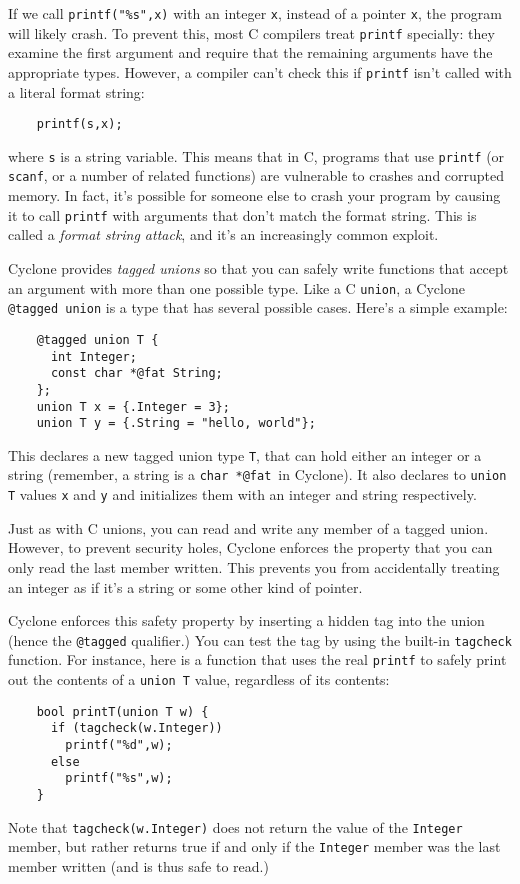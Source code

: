 If we call \texttt{printf("\%s",x)} with an integer \texttt{x},
instead of a pointer \texttt{x}, the program will likely crash.
To prevent this, most C compilers treat \texttt{printf} specially:
they examine the first argument and require that the remaining
arguments have the appropriate types.  However, a compiler can't check
this if \texttt{printf} isn't called with a literal format string:
\begin{verbatim}
    printf(s,x);
\end{verbatim}
where \texttt{s} is a string variable.  This means that in C, programs
that use \texttt{printf} (or \texttt{scanf}, or a number of related
functions) are vulnerable to crashes and corrupted memory.  In fact,
it's possible for someone else to crash your program by causing it to
call \texttt{printf} with arguments that don't match the format
string.  This is called a \emph{format string attack}, and it's an
increasingly common exploit.

Cyclone provides \emph{tagged unions} so that you can safely write
functions that accept an argument with more than one possible type.
Like a C \texttt{union}, a Cyclone \texttt{@tagged union} is a type that has
several possible cases.  Here's a simple example:
\begin{verbatim}
    @tagged union T {
      int Integer;
      const char *@fat String;
    };
    union T x = {.Integer = 3};
    union T y = {.String = "hello, world"};
\end{verbatim}
This declares a new tagged union type \texttt{T}, that can hold either an
integer or a string (remember, a string is a \texttt{char *@fat}\ in
Cyclone).  It also declares to \texttt{union T} values \texttt{x} and
\texttt{y} and initializes them with an integer and string respectively.

Just as with C unions, you can read and write any member of a tagged 
union.  However, to prevent security holes, Cyclone enforces the
property that you can only read the last member written.  This
prevents you from accidentally treating an integer as if it's
a string or some other kind of pointer.  

Cyclone enforces this safety property by inserting a hidden tag
into the union (hence the \texttt{@tagged} qualifier.)  
You can test the
tag by using the built-in \texttt{tagcheck} function.  For
instance, here is a function that uses the real \texttt{printf}
to safely print out the contents of a \texttt{union T} value,
regardless of its contents:
\begin{verbatim}
    bool printT(union T w) {
      if (tagcheck(w.Integer))
        printf("%d",w);
      else 
        printf("%s",w);
    }
\end{verbatim}
Note that \texttt{tagcheck(w.Integer)} does not return the
value of the \texttt{Integer} member, but rather returns true
if and only if the \texttt{Integer} member was the last member
written (and is thus safe to read.)  

